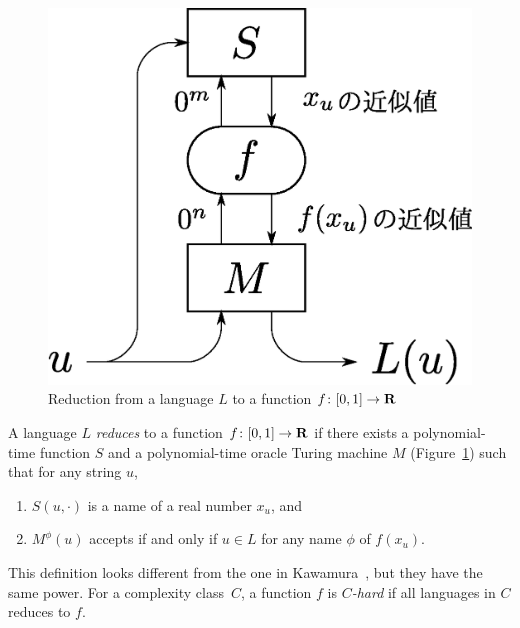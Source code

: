  \begin{figure}
  \begin{center}
  \includegraphics[scale=0.25]{image/reduction.eps}
  \caption{Reduction from a language $L$ to a function $f \colon [0,1] \to \mathbf R$}
  \label{fig:reduction}
  \end{center}
 \end{figure}

\begin{definition}
 A language $L$ \emph{reduces} to a function $f \colon [0, 1] \to \mathbf R$
 if there exists a polynomial-time function $S$ and a polynomial-time oracle Turing machine $M$ (Figure~\ref{fig:reduction})
 such that for any string $u$, 
  \begin{enumerate}
   \item $S(u, \cdot)$ is a name of a real number $x_u$, and 
   \item $M^\phi(u)$ accepts if and only if $u \in L$ for any name $\phi$ of $f(x_u)$.
  \end{enumerate}
\end{definition}
This definition looks different from 
the one in Kawamura~\cite{kawamura2010lipschitz}, 
but they have the same power.
For a complexity class~$C$, a function $f$ is \emph{$C$-hard}
if all languages in $C$ reduces to $f$.
